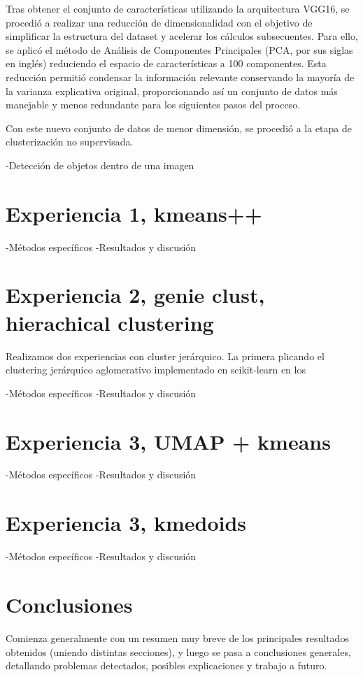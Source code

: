 \documentclass{article}
\begin{document}
Tras obtener el conjunto de características utilizando la arquitectura VGG16, se procedió a realizar una reducción de dimensionalidad con el objetivo de simplificar la estructura del dataset y acelerar los cálculos subsecuentes. Para ello, se aplicó el método de Análisis de Componentes Principales (PCA, por sus siglas en inglés) reduciendo el espacio de características a 100 componentes. Esta reducción permitió condensar la información relevante conservando la mayoría de la varianza explicativa original, proporcionando así un conjunto de datos más manejable y menos redundante para los siguientes pasos del proceso.

Con este nuevo conjunto de datos de menor dimensión, se procedió a la etapa de clusterización no supervisada. 

-Detección de objetos dentro de una imagen 

\section{Experiencia 1, kmeans++}
-Métodos específicos
-Resultados y discusión

\section{Experiencia 2, genie clust, hierachical clustering}
Realizamos dos experiencias con cluster jerárquico. La primera plicando el clustering jerárquico aglomerativo implementado en scikit-learn en los 

-Métodos específicos
-Resultados y discusión

\section{Experiencia 3, UMAP + kmeans}
-Métodos específicos
-Resultados y discusión

\section{Experiencia 3, kmedoids}
-Métodos específicos
-Resultados y discusión


\section{Conclusiones}
Comienza generalmente con un resumen muy breve de los principales resultados obtenidos (uniendo distintas secciones), y luego se pasa a conclusiones generales, detallando problemas detectados, posibles explicaciones y trabajo a futuro.
\end{document}

